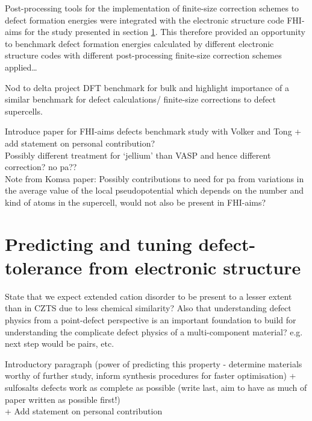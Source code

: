 \documentclass[11pt, twoside]{report}
\begin{document}
Post-processing tools for the implementation of finite-size correction schemes to defect formation energies were integrated with the electronic structure code FHI-aims \cite{FHI-aims} for the study presented in section \ref{sulfosalt_defects}. This therefore provided an opportunity to benchmark defect formation energies calculated by different electronic structure codes with different post-processing finite-size correction schemes applied…

Nod to delta project DFT benchmark for bulk \cite{delta_project_paper} and highlight importance of a similar benchmark for defect calculations/ finite-size corrections to defect supercells.

Introduce paper for FHI-aims defects benchmark study with Volker and Tong + add statement on personal contribution?\\

Possibly different treatment for `jellium' than VASP and hence different correction? no pa??\\

Note from Komsa paper: Possibly contributions to need for pa from variations in the average value of the local pseudopotential which depends on the number and kind of atoms in the supercell, would not also be present in FHI-aims?


\section{Predicting and tuning defect-tolerance from electronic structure}\label{sulfosalt_defects}
State that we expect extended cation disorder to be present to a lesser extent than in CZTS due to less chemical similarity? Also that understanding defect physics from a point-defect perspective is an important foundation to build for understanding the complicate defect physics of a multi-component material? e.g. next step would be pairs, etc.

Introductory paragraph (power of predicting this property - determine materials worthy of further study, inform synthesis procedures for faster optimisation) + sulfosalts defects work as complete as possible (write last, aim to have as much of paper written as possible first!)\\

+ Add statement on personal contribution



\end{document}
